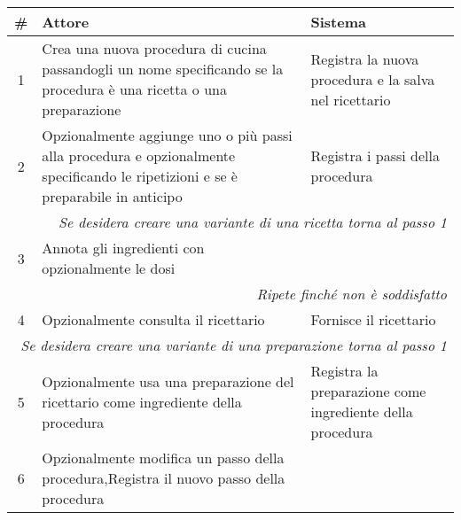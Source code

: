 \begin{tabular}{|c|p{7cm}|p{6.5cm}|}
      \hline\bfseries \# & \bfseries Attore                                                                                                                 & \bfseries Sistema                                         \\\hline

      1                  & Crea una nuova procedura di cucina passandogli un nome specificando se la procedura è una ricetta o una preparazione             & Registra la nuova procedura e la salva nel ricettario     \\\hline
      2                  & Opzionalmente aggiunge uno o più passi alla procedura e opzionalmente specificando le ripetizioni e se è preparabile in anticipo & Registra i passi della procedura                          \\\hline
      \multicolumn{3}{|r|}{\textit{Se desidera creare una variante di una ricetta torna al passo 1}}                                                                                                                    \\\hline
      3                  & Annota gli ingredienti con opzionalmente le dosi                                                                                 &                                                           \\\hline
      \multicolumn{3}{|r|}{\textit{Ripete finché non è soddisfatto}}                                                                                                                                                    \\\hline
      4                  & Opzionalmente consulta il ricettario                                                                                             & Fornisce il ricettario                                    \\\hline
      \multicolumn{3}{|r|}{\textit{Se desidera creare una variante di una preparazione torna al passo 1}}                                                                                                               \\\hline
      5                  & Opzionalmente usa una preparazione del ricettario come ingrediente della procedura                                               & Registra la preparazione come ingrediente della procedura \\\hline
      6                  & Opzionalmente modifica un passo della procedura,Registra il nuovo passo della procedura                                          &                                                           \\\hline

\end{tabular}
